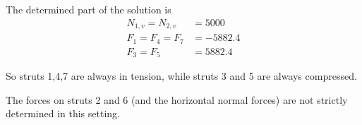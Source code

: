 \begin{applicationActivities}
\begin{observation}
\drawtruss[0.8]{\trussCompletion}
The determined part of the solution is
\begin{align*}
N_{1,v}=N_{2,v}&=5000 \\
F_1=F_4=F_7&=-5882.4 \\
F_3=F_5&=5882.4
\end{align*}

So struts 1,4,7 are always in tension, while struts 3 and 5 are 
always compressed.

The forces on struts 2 and 6 (and the horizontal normal forces) are not strictly determined in this setting.
\end{observation}



\end{applicationActivities}
